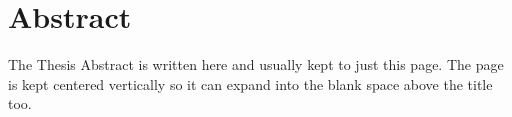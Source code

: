 \documentclass[
	10pt,
	twoside,
	chapterinoneline,
	onehalfspacing, %
	nolistspacing, %
	parskip, %
	headsepline, %
	english,
]{MastersDoctoralThesis} %
\begin{document}


	\tableofcontents %




\mainmatter%
\pagestyle{thesis} %

  
	\chapter{Abstract}

    The Thesis Abstract is written here and usually kept to just this page.
    The page is kept centered vertically so it can expand into the blank space above 
    the title too.
  




% 

	
	\appendix %
	

	\printbibliography[heading=bibintoc]

\end{document}
